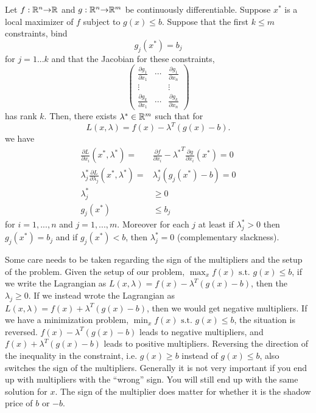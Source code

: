 \begin{theorem} \label{thm:icon} 
  Let $f:\mathbb{R}^n {\rightarrow} \mathbb{R}$ and $g: \mathbb{R}^n {\rightarrow} \mathbb{R}^m$ be continuously
  differentiable. Suppose $x^*$ is a local maximizer of $f$ subject to 
  $g(x) \leq b$. Suppose that the first $k \leq m$ constraints, bind
  \[ g_j(x^*) = b_j \]
  for $j = 1 ... k$ and that the Jacobian for these constraints, 
  \[ \begin{pmatrix} 
    \frac{\partial g_1}{\partial x_1} &  \cdots &\frac{\partial g_1}{\partial x_n}  \\
    \vdots & & \vdots \\
    \frac{\partial g_k}{\partial x_1} &  \cdots &\frac{\partial g_k}{\partial x_n}  
  \end{pmatrix}
  \]
  has rank $k$. Then, there exists
  $\lambda^* \in \mathbb{R}^m$ such that for
  \[ L(x,\lambda) = f(x) - \lambda^T (g(x) - b). \]
  we have
  \begin{align*}
    \frac{\partial L}{\partial x_i}(x^*,\lambda^*) = & \frac{\partial
      f}{\partial x_i} - {\lambda^*}^T \frac{\partial g}{\partial
      x_i}(x^*) = 0 \\
    \lambda_j^* \frac{\partial L}{\partial \lambda_j}(x^*,\lambda^*) =
    & \lambda_j^* \left(g_j(x^*) - b \right)= 0 \\
    \lambda_j^* & \geq 0 \\
    g_j(x^*) & \leq b_j
  \end{align*}
  for $i = 1, ..., n$ and $j=1,...,m$. Moreover for each $j$ at least
  if $\lambda_j^* > 0$ then $g_j(x^*) = b_j$ and if $g_j(x^*) < b$,
  then $\lambda_j^*=0$ (complementary slackness).
\end{theorem}
Some care needs to be taken regarding the sign of the multipliers and
the setup of the problem. Given the setup of our problem, $\max_x f(x)
\text{ s.t. } g(x) \leq b$, if we write the Lagrangian as
$L(x,\lambda) = f(x) - \lambda^T (g(x) - b)$, then the $\lambda_j \geq
0$. If we instead wrote the Lagrangian as $L(x,\lambda) = f(x) +
\lambda^T (g(x) - b)$, then we would get negative multipliers. If we
have a minimization problem, $\min_x f(x) \text{ s.t. } g(x) \leq b$,
the situation is reversed. $f(x) - \lambda^T(g(x) - b)$ leads to
negative multipliers, and $f(x) + \lambda^T(g(x) - b)$ leads to
positive multipliers. Reversing the direction of the inequality in the
constraint, i.e. $g(x) \geq b$ instead of $g(x) \leq b$, also switches
the sign of the multipliers.  Generally it is not very important if
you end up with multipliers with the ``wrong'' sign. You will still
end up with the same solution for $x$. The sign of the multiplier does
matter for whether it is the shadow price of $b$ or $-b$. 

